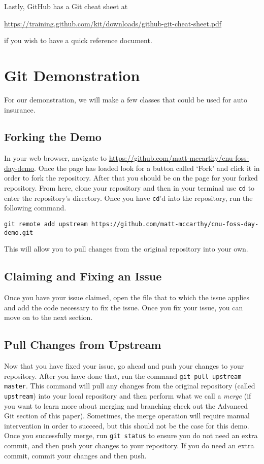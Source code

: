 \documentclass[notitlepage]{simple}
\begin{document}
Lastly, GitHub has a Git cheat sheet at
\begin{center}
\url{https://training.github.com/kit/downloads/github-git-cheat-sheet.pdf}
\end{center}
if you wish to have a quick reference document.


\section{Git Demonstration}

For our demonstration, we will make a few classes that could be used for auto insurance.

\subsection{Forking the Demo}

In your web browser, navigate to \url{https://github.com/matt-mccarthy/cnu-foss-day-demo}.
Once the page has loaded look for a button called `Fork' and click it in order to fork the repository.
After that you should be on the page for your forked repository.
From here, clone your repository and then in your terminal use \verb|cd| to enter the repository's directory.
Once you have \verb|cd|'d into the repository, run the following command.
\begin{center}
\verb|git remote add upstream https://github.com/matt-mccarthy/cnu-foss-day-demo.git|
\end{center}
This will allow you to pull changes from the original repository into your own.

\subsection{Claiming and Fixing an Issue}


Once you have your issue claimed, open the file that to which the issue applies and add the code necessary to fix the issue.
Once you fix your issue, you can move on to the next section.

\subsection{Pull Changes from Upstream}

Now that you have fixed your issue, go ahead and push your changes to your repository.
After you have done that, run the command \verb|git pull upstream master|.
This command will pull any changes from the original repository (called \verb|upstream|) into your local repository and then perform what we call a \textit{merge}
(if you want to learn more about merging and branching check out the Advanced Git section of this paper).
Sometimes, the merge operation will require manual intervention in order to succeed, but this should not be the case for this demo.
Once you successfully merge, run \verb|git status| to ensure you do not need an extra commit, and then push your changes to your repository.
If you do need an extra commit, commit your changes and then push.
\end{document}
